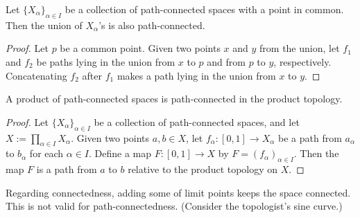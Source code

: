 \begin{prop}
    Let $\{X_\alpha\}_{\alpha\in I}$ be a collection of path-connected spaces with a point in common.
    Then the union of $X_\alpha$'s is also path-connected.
\end{prop}
\begin{proof}
    Let $p$ be a common point.
    Given two points $x$ and $y$ from the union, let $f_1$ and $f_2$ be paths lying in the union from $x$ to $p$ and from $p$ to $y$, respectively.
    Concatenating $f_2$ after $f_1$ makes a path lying in the union from $x$ to $y$.
\end{proof}

\begin{thm}
    A product of path-connected spaces is path-connected in the product topology.
\end{thm}
\begin{proof}
    Let $\{X_\alpha\}_{\alpha\in I}$ be a collection of path-connected spaces, and let $X:=\prod_{\alpha\in I} X_\alpha$.
    Given two points $a, b\in X$, let $f_\alpha: [0, 1]\rightarrow X_\alpha$ be a path from $a_\alpha$ to $b_\alpha$ for each $\alpha\in I$.
    Define a map $F: [0, 1]\rightarrow X$ by $F=(f_\alpha)_{\alpha\in I}$.
    Then the map $F$ is a path from $a$ to $b$ relative to the product topology on $X$.
\end{proof}

\begin{rmk}
    Regarding connectedness, adding some of limit points keeps the space connected.
    This is not valid for path-connectedness. (Consider the topologist's sine curve.)
\end{rmk}

